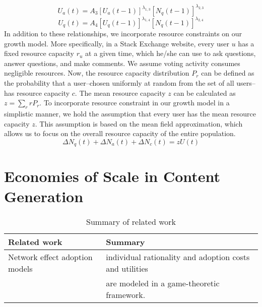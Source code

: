 \begin{equation}
U_a(t) = A_3 [U_a(t-1)]^{\lambda_{1, 3}} [N_q(t-1)]^{\lambda_{2, 3}}
\end{equation}
\begin{equation}
U_q(t) = A_4 [U_q(t-1)]^{\lambda_{1, 4}} [N_q(t-1)]^{\lambda_{2, 4}} 
\end{equation}
\indent In addition to these relationships, we incorporate resource constraints on our growth model. More specifically, in a Stack Exchange website, every user $u$ has a fixed resource capacity $r_u$ at a given time, which he/she can use to ask questions, answer questions, and make comments. We assume voting activity consumes negligible resources. Now, the resource capacity distribution $P_r$ can be defined as the probability that a user--chosen uniformly at random from the set of all users--has resource capacity $c$. The mean resource capacity $z$ can be calculated as $z = \sum_{r}{rP_r}$. To incorporate resource constraint in our growth model in a simplistic manner, we hold the assumption that every user has the mean resource capacity $z$. This assumption is based on the mean field approximation, which allows us to focus on the overall resource capacity of the entire population. 
\begin{equation}
\Delta N_q(t) + \Delta N_a(t) + \Delta N_c(t) = zU(t)
\end{equation}


\section{Economies of Scale in Content Generation}

\begin{table*}[hbt]
	\centering
	\begin{tabular}{|l|l|}
	\hline
	\textbf{Related work} & \textbf{Summary}\\ \hline
	Network effect adoption models & individual rationality and adoption costs and utilities\\
	\cite{Kumar2010}\cite{Kumar2010}\cite{Kumar2010}\cite{Kumar2010}\cite{Kumar2010}\cite{Kumar2010}\cite{Kumar2010}\cite{Kumar2010}\cite{Kumar2010} & are modeled in a game-theoretic framework.\\ \hline
	
	 \end{tabular}
    \caption{Summary of related work}
\end{table*}
\fi







